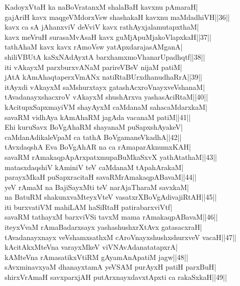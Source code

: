 \documentclass{article}
\begin{document}
KadoyxVtaH ka naBoVratanxM shalaBaH kavxnu pAmaraH|\\
gajAriH kavx maqgeVMdorxVsw shashakaH kavxnu maMdadhiVH||36||\\
kavx ca sA jAhanxviV deVviV kavx rathAyxjalamutapxthaM|\\
kavx meVruH surasaMvAsaH kavx guMjApuMjakoVlapxkaH||37||\\
tathAhaM kavx kavx rAmoVsw yatApxdarajasAMganA|\\
shiliVBUtA kaSxNAdAyxtA barxhamxmoVhanarUpadhqtf||38||\\
iti vAkayxM parxburxvANaM parireVBeV nijaM patiM|\\
jAtA kAmAhaqtaperxVmANx natiRtaBUrxdhanudhaRrA||39||\\
itAyxdi vAkayxM saMshurxtayx gatashAcxroVnayxveVshanaM|\\
tAvadanayxshacxroV vAkayxM shushArxva yashasAciRtaM||40||\\
kAcitupxSapxmayiVM shayAyxM caMdanaM sahacaMdarxkaM|\\
savaRM vidhAya kAmAhaRM jagAda vacanaM patiM||41||\\
Ehi kuruSavx BoVgAhaRM shayanaM puSapxshAyakeV|\\
caMdanAdikaleVpaM ca tathA BoVgamaneVkadhA||42||\\
tAvxdaqshA Eva BoVgAhAR na ca rAmaparAknumxKAH|\\
savaRM rAmakaqpApArxpatxmupaBuMkaSxvX yathAtathaM||43||\\
matasxdaqshiV kAminiV teV caMdanaM tApahArakaM|\\
parayxMkaH puSapxracitaH savaRMrAmakaqpABavaM||44||\\
yeV rAmaM na BajiSayxMti teV narAjaTharaM savxkaM|\\
na BatuRM shakunxvaMteyxVteV vasatxrXBoVgAdivajiRtAH||45||\\
iti burxvatiVM mahiLAM haSiRtaH patirabarxviVtf|\\
savaRM tathayxM barxviVSi tavxM mama rAmakaqpABavaM||46||\\
iteyxVvaM rAmaBadarxsayx yashashushxrXtAvx gatasacxraH|\\
tAvadanayxnayx veVshamxsathxM cAroVnayxshushxshurxveV vacaH||47||\\
kAcitAkxMteVna varayxMkeV viVNAvAdanatatapxrA|\\
kAMteVna rAmasatikxVtiRM gAyamAnApatiM jagw||48||\\
sAvxminavxyaM dhanayxtamA yeVSAM purAyxH patiH parxBuH|\\
shirxVrAmaH savxparxjAH putArxnayxdavxtApxti ca rakaSxkaH||49||\\
\end{document}
